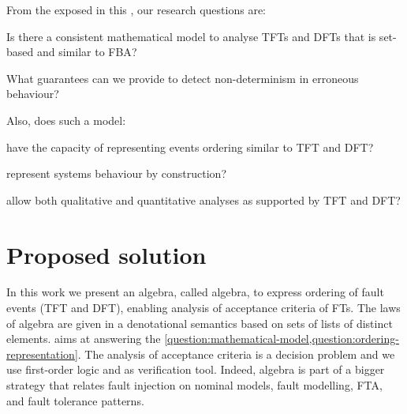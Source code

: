 From the exposed in this , our research questions are:
\begin{rqenum}[series=researchquestion]
  \item Is there a consistent mathematical model to analyse \acp{TFT} and \acp{DFT} that is set-based and similar to \ac{FBA}?\label{question:mathematical-model}
  \item What guarantees can we provide to detect non-determinism in erroneous behaviour?\label{question:non-determinism}
\end{rqenum}
%
Also, does such a model:
%
\begin{rqenum}[resume*=researchquestion]
  \item have the capacity of representing events ordering similar to \ac{TFT} and \ac{DFT}\label{question:ordering-representation}?
  \item represent systems behaviour by construction\label{question:gap}?
  \item allow both qualitative and quantitative analyses as supported by \ac{TFT} and \ac{DFT}\label{question:analyses}?
\end{rqenum}

%

\section{Proposed solution}

In this work we present an algebra, called \acf{algebra}, to express ordering of fault events (\ac{TFT} and \ac{DFT}), enabling analysis of acceptance criteria of \acp{FT}.
The laws of \ac{algebra} are given in a denotational semantics based on sets of lists of distinct elements.
 aims at answering the \cref{question:mathematical-model,question:ordering-representation}.
The analysis of acceptance criteria is a decision problem and we use first-order logic and \isabellehol as verification tool.
Indeed, \ac{algebra} is part of a bigger strategy that relates fault injection on nominal models, fault modelling, \ac{FTA}, and fault tolerance patterns.


